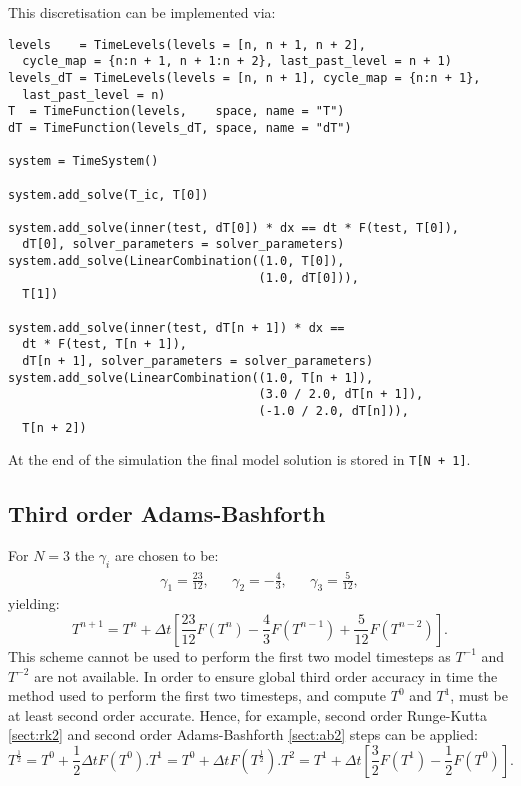 \documentclass[a4paper]{book}
\begin{document}
This discretisation can be implemented via:
\begin{lstlisting}
levels    = TimeLevels(levels = [n, n + 1, n + 2],
  cycle_map = {n:n + 1, n + 1:n + 2}, last_past_level = n + 1)
levels_dT = TimeLevels(levels = [n, n + 1], cycle_map = {n:n + 1},
  last_past_level = n)
T  = TimeFunction(levels,    space, name = "T")
dT = TimeFunction(levels_dT, space, name = "dT")

system = TimeSystem()

system.add_solve(T_ic, T[0])

system.add_solve(inner(test, dT[0]) * dx == dt * F(test, T[0]),
  dT[0], solver_parameters = solver_parameters)
system.add_solve(LinearCombination((1.0, T[0]),
                                   (1.0, dT[0])),
  T[1])

system.add_solve(inner(test, dT[n + 1]) * dx ==
  dt * F(test, T[n + 1]),
  dT[n + 1], solver_parameters = solver_parameters)
system.add_solve(LinearCombination((1.0, T[n + 1]),
                                   (3.0 / 2.0, dT[n + 1]),
                                   (-1.0 / 2.0, dT[n])),
  T[n + 2])
\end{lstlisting}
At the end of the simulation the final model solution is stored in
\verb=T[N + 1]=.

\subsection{Third order Adams-Bashforth}

For $N = 3$ the $\gamma_i$ are chosen to be:
\begin{align}
  \gamma_1 = \frac{23}{12}, & & \gamma_2 = -\frac{4}{3}, & & \gamma_3 = \frac{5}{12},
\end{align}
yielding:
\begin{equation}
  T^{n + 1} = T^n + \Delta t \left[ \frac{23}{12} F(T^n) - \frac{4}{3} F(T^{n - 1}) + \frac{5}{12} F(T^{n - 2}) \right].
\end{equation}
This scheme cannot be used to perform the first two model timesteps as $T^{-1}$
and $T^{-2}$ are not available. In order to ensure global third order accuracy
in time the method used to perform the first two timesteps, and compute $T^0$
and $T^1$, must be at least second order accurate. Hence, for example, second
order Runge-Kutta \ref{sect:rk2} and second order Adams-Bashforth \ref{sect:ab2}
steps can be applied:
\begin{subequations}
  \begin{equation}
    T^{\frac{1}{2}} = T^0 + \frac{1}{2} \Delta t F(T^0).
  \end{equation}
  \begin{equation}
    T^1 = T^0 + \Delta t F(T^{\frac{1}{2}}).
  \end{equation}
  \begin{equation}
    T^2 = T^1 + \Delta t \left[ \frac{3}{2} F(T^1) - \frac{1}{2} F(T^0) \right].
  \end{equation}
\end{subequations}
\end{document}
